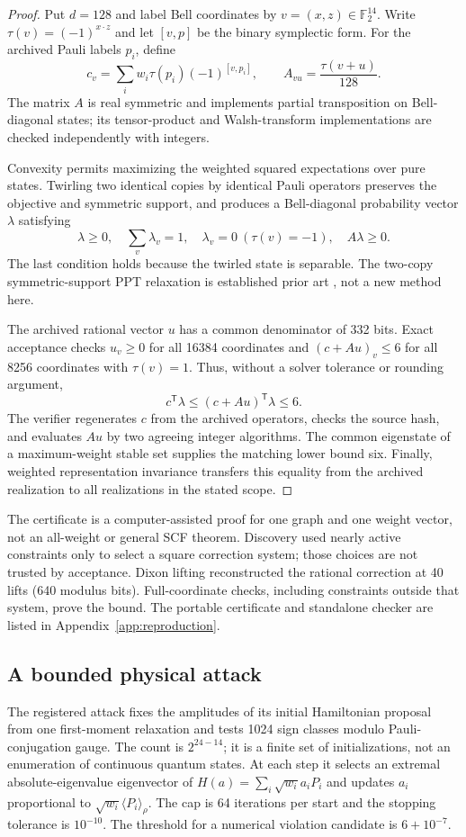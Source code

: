 \documentclass[11pt,a4paper]{article}
\theoremstyle{remark}\newtheorem{remark}[theorem]{Remark}
\newcommand{\ev}[1]{\langle#1\rangle_\rho}
\newcommand{\F}{\mathbb F}
\begin{document}
\begin{proof}
Put $d=128$ and label Bell coordinates by $v=(x,z)\in\F_2^{14}$.
Write $\tau(v)=(-1)^{x\cdot z}$ and let $[v,p]$ be the binary
symplectic form. For the archived Pauli labels $p_i$, define
\[
 c_v=\sum_i w_i\tau(p_i)(-1)^{[v,p_i]},\qquad
 A_{vu}=\frac{\tau(v+u)}{128}.
\]
The matrix $A$ is real symmetric and implements partial transposition
on Bell-diagonal states; its tensor-product and Walsh-transform
implementations are checked independently with integers.

Convexity permits maximizing the weighted squared expectations over
pure states. Twirling two identical copies by identical Pauli operators
preserves the objective and symmetric support, and produces a
Bell-diagonal probability vector $\lambda$ satisfying
\[
 \lambda\geq0,\quad \sum_v\lambda_v=1,\quad
 \lambda_v=0\ (\tau(v)=-1),\quad A\lambda\geq0.
\]
The last condition holds because the twirled state is separable. The
two-copy symmetric-support PPT relaxation is established prior art
\cite[Appendix B.2, Eqs.~(42)--(45)]{xsw2024}, not a new method here.

The archived rational vector $u$ has a common denominator of 332 bits.
Exact acceptance checks $u_v\geq0$ for all 16384 coordinates and
$(c+Au)_v\leq6$ for all 8256 coordinates with $\tau(v)=1$.
Thus, without a solver tolerance or rounding argument,
\[
 c^{\mathsf T}\lambda\leq(c+Au)^{\mathsf T}\lambda\leq6.
\]
The verifier regenerates $c$ from the archived operators, checks the
source hash, and evaluates $Au$ by two agreeing integer algorithms.
The common eigenstate of a maximum-weight stable set supplies the
matching lower bound six. Finally, weighted representation invariance
\cite[Theorems 10 and 12]{xsw2024} transfers this equality from the
archived realization to all realizations in the stated scope.
\end{proof}

The certificate is a computer-assisted proof for one graph and one
weight vector, not an all-weight or general SCF theorem. Discovery used
nearly active constraints only to select a square correction system;
those choices are not trusted by acceptance. Dixon lifting reconstructed
the rational correction at 40 lifts (640 modulus bits). Full-coordinate
checks, including constraints outside that system, prove the bound.
The portable certificate and standalone checker are listed in
Appendix~\ref{app:reproduction}.

\subsection{A bounded physical attack}
The registered attack fixes the amplitudes of its initial Hamiltonian
proposal from one first-moment relaxation and tests 1024 sign classes
modulo Pauli-conjugation gauge. The count is $2^{24-14}$; it is a finite
set of initializations, not an enumeration of continuous quantum states.
At each step it selects an extremal absolute-eigenvalue eigenvector of
$H(a)=\sum_i\sqrt{w_i}a_iP_i$ and updates $a_i$ proportional to
$\sqrt{w_i}\ev{P_i}$. The cap is 64 iterations per start and the
stopping tolerance is $10^{-10}$. The threshold for a numerical
violation candidate is $6+10^{-7}$.
\end{document}

